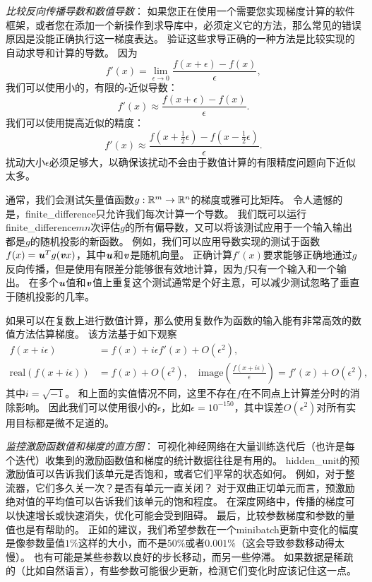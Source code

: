 \emph{比较反向传播导数和数值导数}：
如果您正在使用一个需要您实现梯度计算的软件框架，或者您在添加一个新操作到求导库中，必须定义它的方法，那么常见的错误原因是没能正确执行这一梯度表达。
验证这些求导正确的一种方法是比较实现的自动求导和计算的导数。
因为
\begin{equation}
	f'(x) = \lim_{\epsilon \to 0} \frac{f(x+\epsilon) - f(x)}{\epsilon},
\end{equation}
我们可以使用小的，有限的$\epsilon$近似导数：
\begin{equation}
	f'(x) \approx \frac{f(x+\epsilon) - f(x)}{\epsilon}.
\end{equation}
我们可以使用提高近似的精度：
\begin{equation}
	f'(x) \approx \frac{ f(x+\frac{1}{2}\epsilon) - f(x-\frac{1}{2}\epsilon) }{\epsilon}.
\end{equation}
扰动大小$\epsilon$必须足够大，以确保该扰动不会由于数值计算的有限精度问题向下近似太多。


通常，我们会测试矢量值函数$g:\mathbb{R}^m \to \mathbb{R}^n$的梯度或雅可比矩阵。
令人遗憾的是，\gls{finite_difference}只允许我们每次计算一个导数。
我们既可以运行\gls{finite_difference}$mn$次评估$g$的所有偏导数，又可以将该测试应用于一个输入输出都是$g$的随机投影的新函数。
例如，我们可以应用导数实现的测试于函数$f(x) = \boldsymbol{\mathit{u}}^T g(\boldsymbol{\mathit{v}} x)$，其中$\boldsymbol{\mathit{u}}$和$\boldsymbol{\mathit{v}}$是随机向量。
正确计算$f'(x)$要求能够正确地通过$g$反向传播，但是使用有限差分能够很有效地计算，因为$f$只有一个输入和一个输出。
在多个$\boldsymbol{\mathit{u}}$值和$\boldsymbol{\mathit{v}}$值上重复这个测试通常是个好主意，可以减少测试忽略了垂直于随机投影的几率。


如果可以在复数上进行数值计算，那么使用复数作为函数的输入能有非常高效的数值方法估算梯度\citep{Squire+Trapp-1998}。
该方法基于如下观察
\begin{align}
	f(x + i\epsilon) &= f(x) + i\epsilon f'(x) + O(\epsilon^2) ,\\
	\text{real}( f(x+i\epsilon) ) &= f(x) + O(\epsilon^2), \quad \text{image}( \frac{f(x+i\epsilon)}{ \epsilon } ) = f'(x) + O(\epsilon^2),
\end{align}
其中$i=\sqrt{-1}$。
和上面的实值情况不同，这里不存在$f$在不同点上计算差分时的消除影响。
因此我们可以使用很小的$\epsilon$，比如$\epsilon = 10^{-150}$，其中误差$O(\epsilon^2)$对所有实用目标都是微不足道的。


\emph{监控激励函数值和梯度的直方图}：
可视化神经网络在大量训练迭代后（也许是每个迭代）收集到的激励函数值和梯度的统计数据往往是有用的。
\gls{hidden_unit}的预激励值可以告诉我们该单元是否饱和，或者它们平常的状态如何。
例如，对于整流器，它们多久关一次？是否有单元一直关闭？
对于双曲正切单元而言，预激励绝对值的平均值可以告诉我们该单元的饱和程度。
在深度网络中，传播的梯度可以快速增长或快速消失，优化可能会受到阻碍。
最后，比较参数梯度和参数的量值也是有帮助的。
正如\citep{Bottou-DLSS2015}的建议，我们希望参数在一个\gls{minibatch}更新中变化的幅度是像参数量值$1\%$这样的大小，而不是$50\%$或者$0.001\%$（这会导致参数移动得太慢）。
也有可能是某些参数以良好的步长移动，而另一些停滞。
如果数据是稀疏的（比如自然语言），有些参数可能很少更新，检测它们变化时应该记住这一点。

